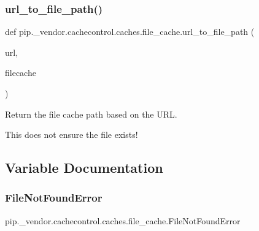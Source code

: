 \subsubsection{\texorpdfstring{url\+\_\+to\+\_\+file\+\_\+path()}{url\_to\_file\_path()}}
{\footnotesize\ttfamily def pip.\+\_\+vendor.\+cachecontrol.\+caches.\+file\+\_\+cache.\+url\+\_\+to\+\_\+file\+\_\+path (\begin{DoxyParamCaption}\item[{}]{url,  }\item[{}]{filecache }\end{DoxyParamCaption})}

\begin{DoxyVerb}Return the file cache path based on the URL.

This does not ensure the file exists!
\end{DoxyVerb}
 

\subsection{Variable Documentation}
\mbox{\label{namespacepip_1_1__vendor_1_1cachecontrol_1_1caches_1_1file__cache_a8f1e09e84a2069f0b4aa01fbd5b0906a}} 
\subsubsection{\texorpdfstring{File\+Not\+Found\+Error}{FileNotFoundError}}
{\footnotesize\ttfamily pip.\+\_\+vendor.\+cachecontrol.\+caches.\+file\+\_\+cache.\+File\+Not\+Found\+Error}

